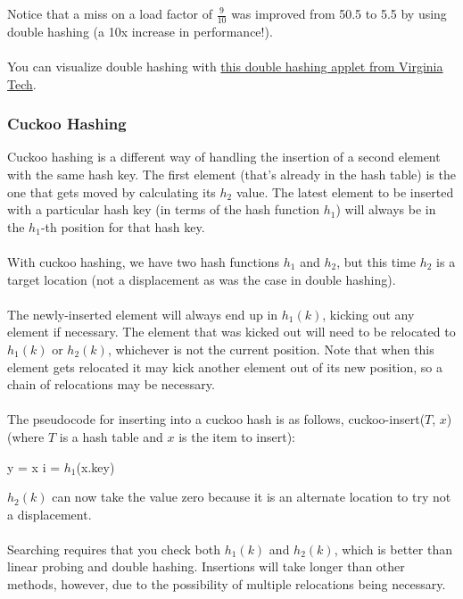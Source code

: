 \documentclass[]{article}
\theoremstyle{definition}
\newcommand{\lecture}[1]{\marginpar{{\footnotesize $\leftarrow$ \underline{#1}}}}
\begin{document}
				Notice that a miss on a load factor of $\frac{9}{10}$ was improved from 50.5 to 5.5 by using double hashing (a 10x increase in performance!).
				\\ \\
				You can visualize double hashing with \href{http://research.cs.vt.edu/AVresearch/hashing/double.php}{this double hashing applet from Virginia Tech}.
				
				\subsubsection{Cuckoo Hashing}
					Cuckoo hashing is a different way of handling the insertion of a second element with the same hash key. The first element (that's already in the hash table) is the one that gets moved by calculating its $h_2$ value. The latest element to be inserted with a particular hash key (in terms of the hash function $h_1$) will always be in the $h_1$-th position for that hash key.
					\\ \\
					\lecture{March 5, 2013}
					With cuckoo hashing, we have two hash functions $h_1$ and $h_2$, but this time $h_2$ is a target location (not a displacement as was the case in double hashing).
					\\ \\
					The newly-inserted element will always end up in $h_1(k)$, kicking out any element if necessary. The element that was kicked out will need to be relocated to $h_1(k)$ or $h_2(k)$, whichever is not the current position. Note that when this element gets relocated it may kick another element out of its new position, so a chain of relocations may be necessary.
					\\ \\
					The pseudocode for inserting into a cuckoo hash is as follows, cuckoo-insert($T$, $x$) (where $T$ is a hash table and $x$ is the item to insert): \\
					\begin{algorithm}[H]
						y = x\;
						i = $h_1$(x.key)\;
					\end{algorithm}

					$h_2(k)$ can now take the value zero because it is an alternate location to try \textendash{} not a displacement.
					\\ \\
					Searching requires that you check both $h_1(k)$ and $h_2(k)$, which is better than linear probing and double hashing. Insertions will take longer than other methods, however, due to the possibility of multiple relocations being necessary.
\end{document}
